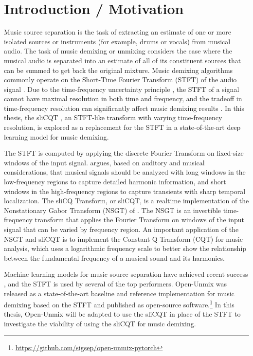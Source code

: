 \documentclass[letter,12pt]{article}
\title{\vspace{-2.25em}\ThesisTitle\vspace{-0.5em}}
\author{Sevag Hanssian}
\date{\vspace{-0.5em}November 12, 2021\vspace{-1.25em}}
\begin{document}
\maketitle

\section{Introduction / Motivation}

Music source separation is the task of extracting an estimate of one or more isolated sources or instruments (for example, drums or vocals) from musical audio. The task of music demixing or unmixing considers the case where the musical audio is separated into an estimate of all of its constituent sources that can be summed to get back the original mixture. Music demixing algorithms commonly operate on the Short-Time Fourier Transform (STFT) of the audio signal \parencite{musicsepgood}. Due to the time-frequency uncertainty principle \parencite{gabor1946}, the STFT of a signal cannot have maximal resolution in both time and frequency, and the tradeoff in time-frequency resolution can significantly affect music demixing results \parencite{tftradeoff1}. In this thesis, the sliCQT \parencite{slicq}, an STFT-like transform with varying time-frequency resolution, is explored as a replacement for the STFT in a state-of-the-art deep learning model for music demixing.

The STFT is computed by applying the discrete Fourier Transform on fixed-size windows of the input signal. \textcite{doerflerphd} argues, based on auditory and musical considerations, that musical signals should be analyzed with long windows in the low-frequency regions to capture detailed harmonic information, and short windows in the high-frequency regions to capture transients with sharp temporal localization. The sliCQ Transform, or sliCQT, is a realtime implementation of the Nonstationary Gabor Transform (NSGT) of \textcite{balazs}. The NSGT is an invertible time-frequency transform that applies the Fourier Transform on windows of the input signal that can be varied by frequency region. An important application of the NSGT and sliCQT is to implement the Constant-Q Transform (CQT) \parencite{jbrown} for music analysis, which uses a logarithmic frequency scale to better show the relationship between the fundamental frequency of a musical sound and its harmonics.

Machine learning models for music source separation have achieved recent success \parencite{sisec2018}, and the STFT is used by several of the top performers. Open-Unmix \parencite{umx} was released as a state-of-the-art baseline and reference implementation for music demixing based on the STFT and published as open-source software.\footnote{\url{https://github.com/sigsep/open-unmix-pytorch}} In this thesis, Open-Unmix will be adapted to use the sliCQT in place of the STFT to investigate the viability of using the sliCQT for music demixing.
\end{document}
